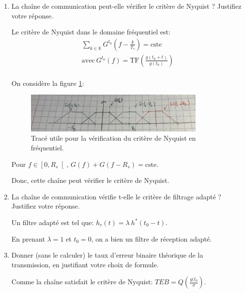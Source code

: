 \documentclass[frenchb]{article}
\begin{document}
    \begin{enumerate}
        \item La chaîne de communication peut-elle vérifier le critère de Nyquist ? Justifiez votre réponse.
        \par\leavevmode\par
        \setlength\parindent{0.5cm}
        Le critère de Nyquist dans le domaine fréquentiel est: 
        \begin{equation*}
        \begin{split}
        \sum\limits_{k \in \mathbb{K}}{G^{t_0}\left(f-\frac{k}{T_s} \right)} =  \text{cste}\\
        \text{avec} \ G^{t_0}(f) = \mathrm{TF}\left(\frac{g\left(t_0 + t\right)}{g\left(t_0 \right)}\right) \\
        \end{split}
        \end{equation*}
        
        On considère la figure \ref{fig : C3Q1}:
        
        \begin{figure}[ht!]
        \centering
        \includegraphics[width = 9cm]{C3Q1.jpg}
        \caption{Tracé utile pour la vérification du critère de Nyquist en fréquentiel. \label{fig : C3Q1}}
        \end{figure}
        
        Pour $f \in \left[0, R_s \right[$, $G(f) + G(f-R_s) = \text{cste}$.
        
        Donc, cette chaîne peut vérifier le critère de Nyquist. 
        \par\leavevmode\par
        \item La chaîne de communication vérifie t-elle le critère de filtrage adapté ? Justifiez votre réponse.
        \par\leavevmode\par
        \setlength\parindent{0.5cm}
        Un filtre adapté est tel que: $h_r(t) = \lambda \ h^*(t_0-t)$. 
        
        En prenant 	$\lambda = 1$ et $t_0 = 0$, on a bien un filtre de réception adapté. 
       \par\leavevmode\par
        \item Donner (sans le calculer) le taux d'erreur binaire théorique de la transmission, en justifiant votre choix de formule.
        \par\leavevmode\par
        \setlength\parindent{0.5cm}
        Comme  la chaîne satisfait le critère de Nyquist: $TEB = Q\left(\frac{g(t_0}{\sigma}\right)$. 
        

\end{enumerate}
\end{document}
